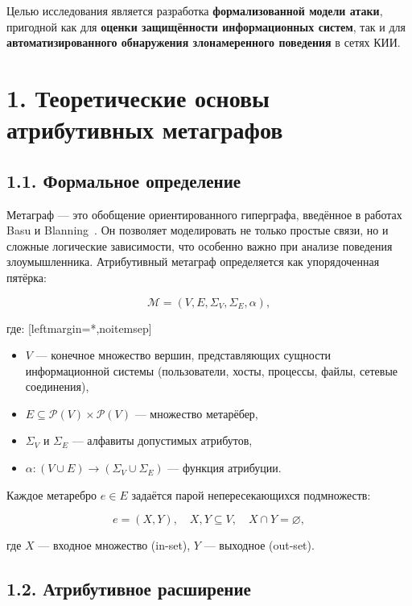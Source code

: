 \documentclass[12pt,a4paper]{article}
\begin{document}
Целью исследования является разработка \textbf{формализованной модели атаки}, пригодной как для \textbf{оценки защищённости информационных систем}, так и для \textbf{автоматизированного обнаружения злонамеренного поведения} в сетях КИИ.

\section*{1. Теоретические основы атрибутивных метаграфов}

\subsection*{1.1. Формальное определение}

Метаграф — это обобщение ориентированного гиперграфа, введённое в работах Basu и Blanning~\cite{basu1994}. Он позволяет моделировать не только простые связи, но и сложные логические зависимости, что особенно важно при анализе поведения злоумышленника. Атрибутивный метаграф определяется как упорядоченная пятёрка:

\begin{equation}
\mathcal{M} = (V, E, \Sigma_V, \Sigma_E, \alpha),
\end{equation}

где:  
[leftmargin=*,noitemsep]
\begin{itemize}
    \item $V$ — конечное множество вершин, представляющих сущности информационной системы (пользователи, хосты, процессы, файлы, сетевые соединения),
    \item $E \subseteq \mathcal{P}(V) \times \mathcal{P}(V)$ — множество метарёбер,
    \item $\Sigma_V$ и $\Sigma_E$ — алфавиты допустимых атрибутов,
    \item $\alpha: (V \cup E) \to (\Sigma_V \cup \Sigma_E)$ — функция атрибуции.
\end{itemize}

Каждое метаребро $e \in E$ задаётся парой непересекающихся подмножеств:

\begin{equation}
e = (X, Y), \quad X, Y \subseteq V, \quad X \cap Y = \varnothing,
\end{equation}

где $X$ — входное множество (in-set), $Y$ — выходное (out-set).

\subsection*{1.2. Атрибутивное расширение}
\end{document}
